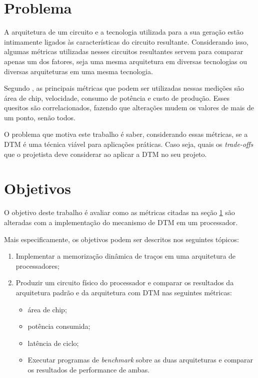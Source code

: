 \section{Problema}
\label{Introducao:Problema}

A arquitetura de um circuito e a tecnologia utilizada para a sua geração estão intimamente ligados às características do circuito resultante. Considerando isso, algumas métricas utilizadas nesses circuitos resultantes servem para comparar apenas um dos fatores, seja uma mesma arquitetura em diversas tecnologias ou diversas arquiteturas em uma mesma tecnologia.

Segundo \cite{chu2006rtl}, as principais métricas que podem ser utilizadas nessas medições são área de chip, velocidade, consumo de potência e custo de produção. Esses quesitos são correlacionados, fazendo que alterações mudem os valores de mais de um ponto, senão todos.

O problema que motiva este trabalho é saber, considerando essas métricas, se a DTM é uma técnica viável para aplicações práticas. Caso seja, quais os \textit{trade-offs} que o projetista deve considerar ao aplicar a DTM no seu projeto.

\section{Objetivos}
\label{Introducao:Objetivos} %

O objetivo deste trabalho é avaliar como as métricas citadas na seção \ref{Introducao:Problema} são alteradas com a implementação do mecanismo de DTM em um processador.

Mais especificamente, os objetivos podem ser descritos nos seguintes tópicos:
\begin{enumerate}
	\item Implementar a memorização dinâmica de traços em uma arquitetura de processadores;
	\item Produzir um circuito físico do processador e comparar os resultados da arquitetura padrão e da arquitetura com DTM nas seguintes métricas:
	\begin{itemize}
		\item área de chip;
		\item potência consumida;
		\item latência de ciclo;
	\item Executar programas de \textit{benchmark} sobre as duas arquiteturas e comparar os resultados de performance de ambas.
	\end{itemize}
\end{enumerate}

